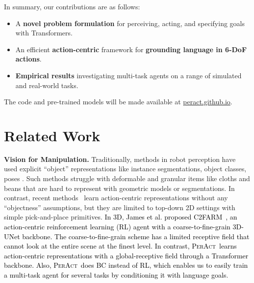 \documentclass{article}
\newcommand{\highlight}[1]{\textcolor{black}{#1}}
\newcommand{\model}{\textsc{PerAct}}
\begin{document}
In summary, our contributions are as follows:
\vspace{-0.2em}
\begin{itemize}[leftmargin=0.8cm,itemsep=0.05em]
    \item A \textbf{novel problem formulation} for perceiving, acting, and specifying goals with Transformers.
    \item An efficient \textbf{action-centric} framework for \textbf{grounding language in 6-DoF actions}.
    \item \textbf{Empirical results} investigating multi-task agents on a range of simulated and real-world tasks. 
\end{itemize}
The code and pre-trained models will be made available  at \url{peract.github.io}. 








\section{Related Work}
\label{sec:related_work}
\textbf{Vision for Manipulation.} Traditionally, methods in robot perception have used explicit ``object'' representations like instance segmentations, object classes, poses  \citep{he2017mask,Xiang-RSS-18,zhu2014single,zeng2017multi,deng2020self,xie2020best}. Such methods struggle with deformable and granular items like cloths and beans that are hard to represent with geometric models or segmentations. 
In contrast, recent methods~\citep{zeng2019robotic,zengTransporterNetworksRearranging2021,cliport,stengel2022guiding} learn action-centric representations without any ``objectness'' assumptions, but they are limited to top-down 2D settings with simple pick-and-place primitives. \highlight{In 3D, James et al. proposed C2FARM~\citep{c2farm}, an action-centric reinforcement learning (RL) agent with a coarse-to-fine-grain 3D-UNet backbone. The coarse-to-fine-grain scheme has a limited receptive field that cannot look at the entire scene at the finest level. In contrast, \model~learns action-centric representations with a global-receptive field through a Transformer backbone. Also, \model~does BC instead of RL, which enables us to easily train a multi-task agent for several tasks by conditioning it with language goals}. 
\end{document}
